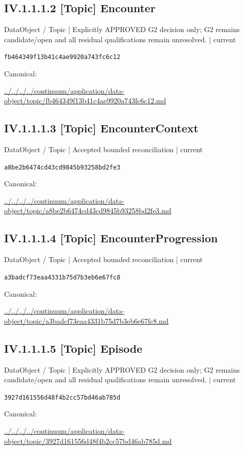 \documentclass[10pt,a4paper]{article}
\begin{document}
\subsection*{IV.1.1.1.2 [Topic] Encounter}
\label{element-fb464349f13b41c4ae9920a743fc6c12}
{\small DataObject / Topic | Explicitly APPROVED G2 decision only; G2 remains candidate/open and all residual qualifications remain unresolved. | current}\par
\texttt{fb464349f13b41c4ae9920a743fc6c12}\par
Canonical: \par
{\footnotesize\url{../../../../continuum/application/data-object/topic/fb464349f13b41c4ae9920a743fc6c12.md}}\par
\subsection*{IV.1.1.1.3 [Topic] EncounterContext}
\label{element-a8be2b6474cd43cd9845b93258bd2fe3}
{\small DataObject / Topic | Accepted bounded reconciliation | current}\par
\texttt{a8be2b6474cd43cd9845b93258bd2fe3}\par
Canonical: \par
{\footnotesize\url{../../../../continuum/application/data-object/topic/a8be2b6474cd43cd9845b93258bd2fe3.md}}\par
\subsection*{IV.1.1.1.4 [Topic] EncounterProgression}
\label{element-a3badcf73eaa4331b75d7b3eb6e67fc8}
{\small DataObject / Topic | Accepted bounded reconciliation | current}\par
\texttt{a3badcf73eaa4331b75d7b3eb6e67fc8}\par
Canonical: \par
{\footnotesize\url{../../../../continuum/application/data-object/topic/a3badcf73eaa4331b75d7b3eb6e67fc8.md}}\par
\subsection*{IV.1.1.1.5 [Topic] Episode}
\label{element-3927d161556d48f4b2cc57bd46ab785d}
{\small DataObject / Topic | Explicitly APPROVED G2 decision only; G2 remains candidate/open and all residual qualifications remain unresolved. | current}\par
\texttt{3927d161556d48f4b2cc57bd46ab785d}\par
Canonical: \par
{\footnotesize\url{../../../../continuum/application/data-object/topic/3927d161556d48f4b2cc57bd46ab785d.md}}\par
\end{document}
